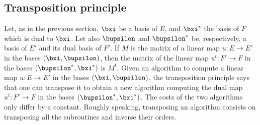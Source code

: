 \documentclass[a4paper,11pt]{article}
\theoremstyle{break}
\theoremstyle{definition}
\theoremstyle{remark}
\begin{document}
\subsection{Transposition principle}
Let, as in the previous section, $\bxi$ be a basis of $E$, and $\bxi^*$ the
basis of $F$ which is dual to $\bxi$. Let also $\bupsilon$ and $\bupsilon^*$ be, respectively,
a
basis of $E'$ and its dual basis of $F'$. If $M$ is the matrix of a linear map
$u:E\rightarrow E'$ in the
bases $(\bxi,\bupsilon)$, then the matrix of the linear map $u^t:F'\rightarrow 
F$ in the bases
$(\bupsilon^*,\bxi^*)$ is $M^t$. Given an algorithm to compute a linear map
$u:E\rightarrow E'$ in the bases $(\bxi,\bupsilon)$, the transposition principle
says that one can transpose it to obtain a new algorithm computing the dual map 
$u^t:F'\rightarrow F$ in the bases
$(\bupsilon^*,\bxi^*)$. The costs of the two algorithms only differ by a
constant. Roughly speaking, transposing an algorithm consists on transposing all
the subroutines and inverse their orders.
\end{document}
